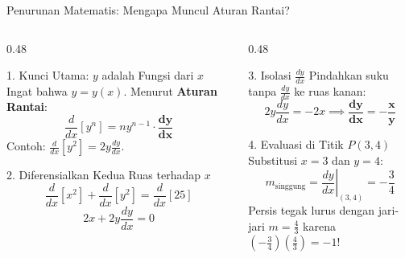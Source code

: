 \documentclass[aspectratio=169,10pt]{beamer}
\begin{document}
\begin{frame}{Penurunan Matematis: Mengapa Muncul Aturan Rantai?}
    \begin{columns}[T]
        \begin{column}{0.48\textwidth}
            \begin{block}{1. Kunci Utama: $y$ adalah Fungsi dari $x$}
                Ingat bahwa $y = y(x)$. Menurut \textbf{Aturan Rantai}:
                \[
                    \frac{d}{dx}\left[ y^n \right] = n y^{n-1} \cdot \mathbf{\frac{dy}{dx}}
                \]
                Contoh: $\frac{d}{dx}[y^2] = 2y \frac{dy}{dx}$.
            \end{block}

            \begin{block}{2. Diferensialkan Kedua Ruas terhadap $x$}
                \[
                    \frac{d}{dx}[x^2] + \frac{d}{dx}[y^2] = \frac{d}{dx}[25]
                \]
                \[
                    2x + 2y \frac{dy}{dx} = 0
                \]
            \end{block}
        \end{column}

        \begin{column}{0.48\textwidth}
            \begin{exampleblock}{3. Isolasi $\frac{dy}{dx}$}
                Pindahkan suku tanpa $\frac{dy}{dx}$ ke ruas kanan:
                \[
                    2y \frac{dy}{dx} = -2x \implies \mathbf{\frac{dy}{dx} = -\frac{x}{y}}
                \]
            \end{exampleblock}

            \begin{alertblock}{4. Evaluasi di Titik $P(3, 4)$}
                Substitusi $x = 3$ dan $y = 4$:
                \[
                    m_{\text{singgung}} = \left. \frac{dy}{dx} \right|_{(3, 4)} = -\frac{3}{4}
                \]
                Persis tegak lurus dengan jari-jari $m = \frac{4}{3}$ karena $\left(-\frac{3}{4}\right)\left(\frac{4}{3}\right) = -1$!
            \end{alertblock}
        \end{column}
    \end{columns}
\end{frame}
\end{document}
